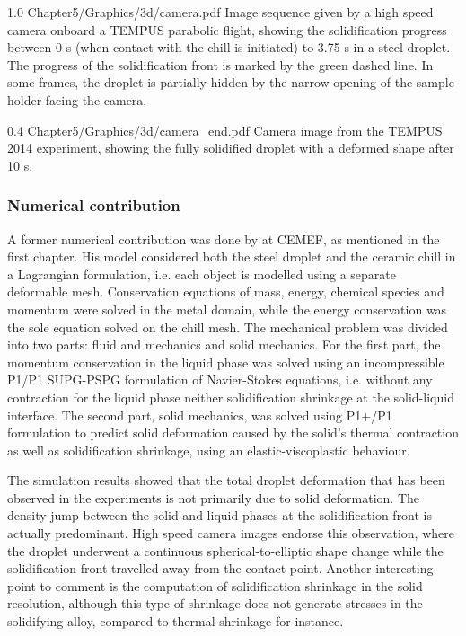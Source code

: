 \begin{figureth}
{1.0}
{Chapter5/Graphics/3d/camera.pdf}
{Image sequence given by a high speed camera onboard a TEMPUS parabolic flight, showing the 
solidification progress between 0 s (when contact with the chill is initiated) to 3.75 s in a  steel droplet. 
The progress of the solidification front is marked by the green dashed line. In some frames, the droplet is partially hidden by the narrow 
opening of the sample holder facing the camera.}
\label{fig:camera}
\end{figureth}

\begin{figureth}
{0.4}
{Chapter5/Graphics/3d/camera_end.pdf}
{Camera image from the TEMPUS 2014 experiment, showing the fully solidified droplet with a deformed shape after 10 s.}
\label{fig:camera_end}
\end{figureth}

\subsubsection{Numerical contribution}

A former numerical contribution was done by \citet{rivaux_simulation_2011} at CEMEF, as mentioned in the first chapter. 
His model considered both the steel droplet and the ceramic chill in a Lagrangian formulation, i.e. each object is
modelled using a separate deformable mesh. Conservation equations of mass, energy,
chemical species and momentum were solved in the metal domain, while the energy
conservation was the sole equation solved on the chill mesh. The mechanical problem was divided
into two parts: fluid and mechanics and solid mechanics. For the first part, the momentum conservation in the liquid phase was solved using an
incompressible P1/P1 SUPG-PSPG formulation of Navier-Stokes equations, i.e. 
without any contraction for the liquid phase neither solidification shrinkage at the solid-liquid interface.
The second part, solid mechanics, was solved using P1+/P1 formulation to predict solid deformation caused by the 
solid's thermal contraction as well as solidification shrinkage, 
using an elastic-viscoplastic behaviour. 

The simulation results showed that the total droplet deformation that has been
observed in the experiments is not primarily due to solid deformation. The density jump
between the solid and liquid phases at the solidification front is actually predominant. High
speed camera images endorse this observation, where the droplet underwent a continuous
spherical-to-elliptic shape change while the solidification front travelled away from the
contact point. Another interesting point to comment is the computation of solidification
shrinkage in the solid resolution, although this type of shrinkage does not generate stresses 
in the solidifying alloy, compared to thermal shrinkage for instance.

